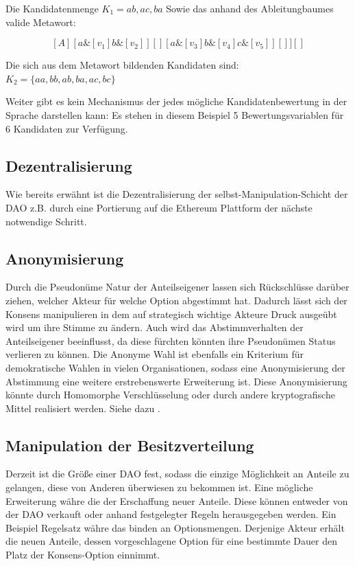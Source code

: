 \documentclass[a4paper,12pt]{report}
\begin{document}
Die Kandidatenmenge $K_1={ab, ac, ba}$
Sowie das anhand des Ableitungbaumes valide Metawort: 

\[ [A][ a\&[v_1]b\&[v_2] ][][ a\&[v_3]b\&[v_4]c\&[v_5] ][] ][] \] 


Die sich aus dem Metawort bildenden Kandidaten sind: $K_2=\{ aa, bb, ab, ba, ac, bc \}$

Weiter gibt es kein Mechanismus der jedes mögliche Kandidatenbewertung in der Sprache darstellen kann: Es stehen in diesem Beispiel 5 Bewertungsvariablen für 6 Kandidaten zur Verfügung. 

\subsection*{Dezentralisierung}
Wie bereits erwähnt ist die Dezentralisierung der selbst-Manipulation-Schicht der DAO z.B. durch eine Portierung auf die Ethereum Plattform der nächste notwendige Schritt.

\subsection*{Anonymisierung}
Durch die Pseudonüme Natur der Anteilseigener lassen sich Rückschlüsse darüber ziehen, welcher Akteur für welche Option abgestimmt hat. Dadurch lässt sich der Konsens manipulieren in dem auf strategisch wichtige Akteure Druck ausgeübt wird um ihre Stimme zu ändern. Auch wird das Abstimmverhalten der Anteilseigener beeinflusst, da diese fürchten könnten ihre Pseudonümen Status verlieren zu können. Die Anonyme Wahl ist ebenfalls ein Kriterium für demokratische Wahlen in vielen Organisationen, sodass eine Anonymisierung der Abstimmung eine weitere erstrebenswerte Erweiterung ist. Diese Anonymisierung könnte durch Homomorphe Verschlüsselung\cite{Gentry2009} oder durch andere kryptografische Mittel realisiert werden. Siehe dazu \cite{Fouard}.

\subsection*{Manipulation der Besitzverteilung}
Derzeit ist die Größe einer DAO fest, sodass die einzige Möglichkeit an Anteile zu gelangen, diese von Anderen überwiesen zu bekommen ist. Eine mögliche Erweiterung währe die der Erschaffung neuer Anteile. Diese können entweder von der DAO verkauft oder anhand festgelegter Regeln herausgegeben werden. Ein Beispiel Regelsatz währe das binden an Optionsmengen. Derjenige Akteur erhält die neuen Anteile, dessen vorgeschlagene Option für eine bestimmte Dauer den Platz der Konsens-Option einnimmt.
\end{document}
